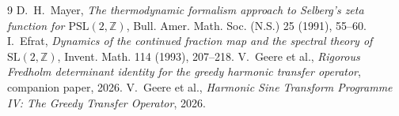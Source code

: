 \documentclass[11pt,a4paper]{article}
\begin{document}
\begin{thebibliography}{9}
D.~H.~Mayer, \emph{The thermodynamic formalism approach to Selberg's zeta function for \(\mathrm{PSL}(2,\mathbb{Z})\)}, Bull. Amer. Math. Soc. (N.S.) 25 (1991), 55--60.
I.~Efrat, \emph{Dynamics of the continued fraction map and the spectral theory of \(\mathrm{SL}(2,\mathbb{Z})\)}, Invent. Math. 114 (1993), 207--218.
V.~Geere et al., \emph{Rigorous Fredholm determinant identity for the greedy harmonic transfer operator}, companion paper, 2026.
V.~Geere et al., \emph{Harmonic Sine Transform Programme IV: The Greedy Transfer Operator}, 2026.
\end{thebibliography}
\end{document}
